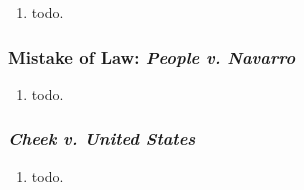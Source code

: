 \begin{enumerate}
    \item todo.
\end{enumerate}

\subsubsection{Mistake of Law: \emph{People v. Navarro}}

\begin{enumerate}
    \item todo.
\end{enumerate}

\subsubsection{\emph{Cheek v. United States}}

\begin{enumerate}
    \item todo.
\end{enumerate}
